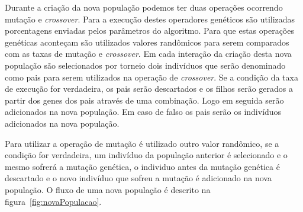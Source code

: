 Durante a criação da nova população podemos ter duas operações ocorrendo mutação e \textit{crossover}. Para a execução destes operadores genéticos são utilizadas porcentagens enviadas pelos parâmetros do algoritmo. Para que estas operações genéticas aconteçam são utilizados valores randômicos para serem comparados com as taxas de mutação e \textit{crossover}. Em cada interação da criação desta nova população são selecionados por torneio dois indivíduos que serão denominado como pais para serem utilizados na operação de \textit{crossover}. Se a condição da taxa de execução for verdadeira, os pais serão descartados e os filhos serão gerados a partir dos genes dos pais através de uma combinação. Logo em seguida serão adicionados na nova população. Em caso de falso os pais serão os indivíduos adicionados na nova população.\par

Para utilizar a operação de mutação é utilizado outro valor randômico, se a condição for verdadeira, um indivíduo da população anterior é selecionado e o mesmo sofrerá a mutação genética, o individuo antes da mutação genética é descartado e o novo indivíduo que sofreu a mutação é adicionado na nova população. O fluxo de uma nova população é descrito na figura~\ref{fig:novaPopulacao}.\par

